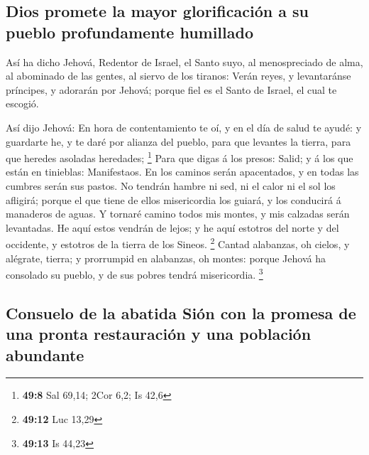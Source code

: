 \hypertarget{dios-promete-la-mayor-glorificaciuxf3n-a-su-pueblo-profundamente-humillado}{%
\subsection{Dios promete la mayor glorificación a su pueblo
profundamente
humillado}\label{dios-promete-la-mayor-glorificaciuxf3n-a-su-pueblo-profundamente-humillado}}

 Así ha dicho Jehová, Redentor de Israel, el Santo suyo, al
menospreciado de alma, al abominado de las gentes, al siervo de los
tiranos: Verán reyes, y levantaránse príncipes, y adorarán por Jehová;
porque fiel es el Santo de Israel, el cual te escogió.

 Así dijo Jehová: En hora de contentamiento te oí, y en el
día de salud te ayudé: y guardarte he, y te daré por alianza del pueblo,
para que levantes la tierra, para que heredes asoladas heredades;
\footnote{\textbf{49:8} Sal 69,14; 2Cor 6,2; Is 42,6}  Para
que digas á los presos: Salid; y á los que están en tinieblas:
Manifestaos. En los caminos serán apacentados, y en todas las cumbres
serán sus pastos.  No tendrán hambre ni sed, ni el calor ni
el sol los afligirá; porque el que tiene de ellos misericordia los
guiará, y los conducirá á manaderos de aguas.  Y tornaré
camino todos mis montes, y mis calzadas serán levantadas. 
He aquí estos vendrán de lejos; y he aquí estotros del norte y del
occidente, y estotros de la tierra de los Sineos. \footnote{\textbf{49:12}
  Luc 13,29}  Cantad alabanzas, oh cielos, y alégrate,
tierra; y prorrumpid en alabanzas, oh montes: porque Jehová ha consolado
su pueblo, y de sus pobres tendrá misericordia. \footnote{\textbf{49:13}
  Is 44,23}

\hypertarget{consuelo-de-la-abatida-siuxf3n-con-la-promesa-de-una-pronta-restauraciuxf3n-y-una-poblaciuxf3n-abundante}{%
\subsection{Consuelo de la abatida Sión con la promesa de una pronta
restauración y una población
abundante}\label{consuelo-de-la-abatida-siuxf3n-con-la-promesa-de-una-pronta-restauraciuxf3n-y-una-poblaciuxf3n-abundante}}

